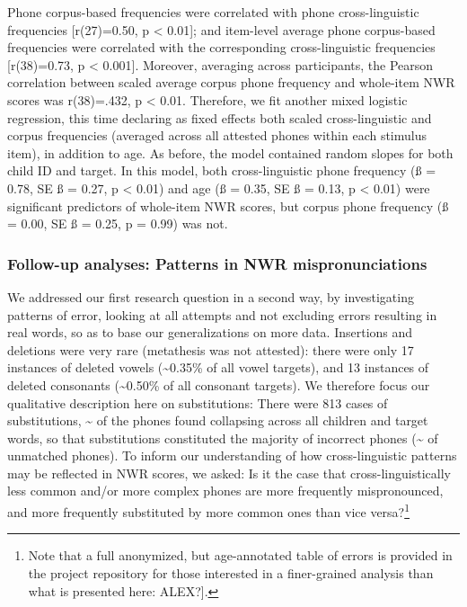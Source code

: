 \documentclass[
  american,
  ,man,floatsintext]{apa6}
\begin{document}
Phone corpus-based frequencies were correlated with phone cross-linguistic frequencies {[}r(27)=0.50, p \textless{} 0.01{]}; and item-level average phone corpus-based frequencies were correlated with the corresponding cross-linguistic frequencies {[}r(38)=0.73, p \textless{} 0.001{]}. Moreover, averaging across participants, the Pearson correlation between scaled average corpus phone frequency and whole-item NWR scores was r(38)=.432, p \textless{} 0.01. Therefore, we fit another mixed logistic regression, this time declaring as fixed effects both scaled cross-linguistic and corpus frequencies (averaged across all attested phones within each stimulus item), in addition to age. As before, the model contained random slopes for both child ID and target. In this model, both cross-linguistic phone frequency (ß = 0.78, SE ß = 0.27, p \textless{} 0.01) and age (ß = 0.35, SE ß = 0.13, p \textless{} 0.01) were significant predictors of whole-item NWR scores, but corpus phone frequency (ß = 0.00, SE ß = 0.25, p = 0.99) was not.

\hypertarget{follow-up-analyses-patterns-in-nwr-mispronunciations}{%
\subsubsection{Follow-up analyses: Patterns in NWR mispronunciations}\label{follow-up-analyses-patterns-in-nwr-mispronunciations}}

We addressed our first research question in a second way, by investigating patterns of error, looking at all attempts and not excluding errors resulting in real words, so as to base our generalizations on more data. Insertions and deletions were very rare (metathesis was not attested): there were only 17 instances of deleted vowels (\textasciitilde0.35\% of all vowel targets), and 13 instances of deleted consonants (\textasciitilde0.50\% of all consonant targets). We therefore focus our qualitative description here on substitutions: There were 813 cases of substitutions, \textasciitilde{} of the phones found collapsing across all children and target words, so that substitutions constituted the majority of incorrect phones (\textasciitilde{} of unmatched phones). To inform our understanding of how cross-linguistic patterns may be reflected in NWR scores, we asked: Is it the case that cross-linguistically less common and/or more complex phones are more frequently mispronounced, and more frequently substituted by more common ones than vice versa?\footnote{Note that a full anonymized, but age-annotated table of errors is provided in the project repository for those interested in a finer-grained analysis than what is presented here: ALEX?{]}.}
\end{document}
